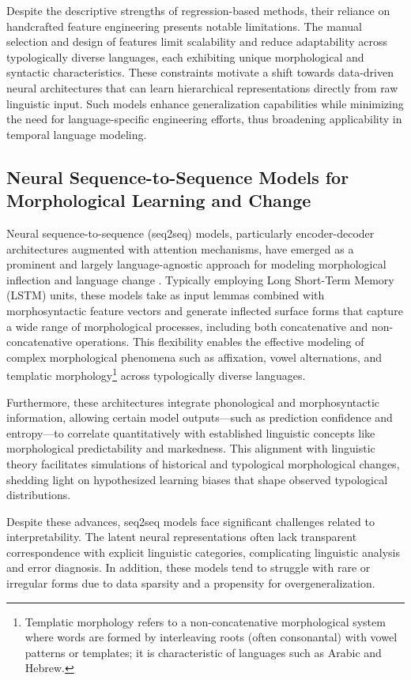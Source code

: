 \documentclass[sigconf]{acmart}
\begin{document}
Despite the descriptive strengths of regression-based methods, their reliance on handcrafted feature engineering presents notable limitations. The manual selection and design of features limit scalability and reduce adaptability across typologically diverse languages, each exhibiting unique morphological and syntactic characteristics. These constraints motivate a shift towards data-driven neural architectures that can learn hierarchical representations directly from raw linguistic input. Such models enhance generalization capabilities while minimizing the need for language-specific engineering efforts, thus broadening applicability in temporal language modeling.

\subsection{Neural Sequence-to-Sequence Models for Morphological Learning and Change}

Neural sequence-to-sequence (seq2seq) models, particularly encoder-decoder architectures augmented with attention mechanisms, have emerged as a prominent and largely language-agnostic approach for modeling morphological inflection and language change \cite{ref42}. Typically employing Long Short-Term Memory (LSTM) units, these models take as input lemmas combined with morphosyntactic feature vectors and generate inflected surface forms that capture a wide range of morphological processes, including both concatenative and non-concatenative operations. This flexibility enables the effective modeling of complex morphological phenomena such as affixation, vowel alternations, and templatic morphology\footnote{Templatic morphology refers to a non-concatenative morphological system where words are formed by interleaving roots (often consonantal) with vowel patterns or templates; it is characteristic of languages such as Arabic and Hebrew.} across typologically diverse languages.

Furthermore, these architectures integrate phonological and morphosyntactic information, allowing certain model outputs—such as prediction confidence and entropy—to correlate quantitatively with established linguistic concepts like morphological predictability and markedness. This alignment with linguistic theory facilitates simulations of historical and typological morphological changes, shedding light on hypothesized learning biases that shape observed typological distributions.

Despite these advances, seq2seq models face significant challenges related to interpretability. The latent neural representations often lack transparent correspondence with explicit linguistic categories, complicating linguistic analysis and error diagnosis. In addition, these models tend to struggle with rare or irregular forms due to data sparsity and a propensity for overgeneralization.
\end{document}
